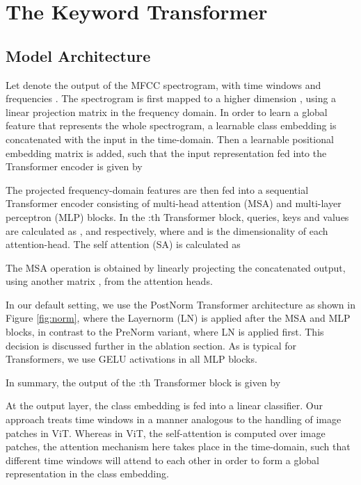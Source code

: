 \documentclass[a4paper]{article}
\begin{document}
\section{The Keyword Transformer}

\subsection{Model Architecture}

Let  denote the output of the MFCC spectrogram, with time windows  and frequencies . The spectrogram is first mapped to a higher dimension , using a linear projection matrix  in the frequency domain. In order to learn a global feature that represents the whole spectrogram, a learnable class embedding  is concatenated with the input in the time-domain. Then a learnable positional embedding matrix  is added, such that the input representation fed into the Transformer encoder is given by

The projected frequency-domain features are then fed into a sequential Transformer encoder consisting of  multi-head attention (MSA) and multi-layer perceptron (MLP) blocks. In the :th Transformer block, queries, keys and values are calculated as ,  and  respectively, where  and  is the dimensionality of each attention-head. The self attention (SA) is calculated as

The MSA operation is obtained by linearly projecting the concatenated output, using another matrix , from the  attention heads.

In our default setting, we use the PostNorm \cite{vaswani2017attention} Transformer architecture as shown in Figure \ref{fig:norm}, where the Layernorm (LN) \cite{ba2016layer} is applied after the MSA and MLP blocks, in contrast to the PreNorm \cite{he2016deep} variant, where LN is applied first. This decision is discussed further in the ablation section. As is typical for Transformers, we use GELU \cite{hendrycks2016gaussian} activations in all MLP blocks.

In summary, the output of the :th Transformer block is given by

At the output layer, the class embedding is fed into a linear classifier. Our approach treats time windows in a manner analogous to the handling of image patches in ViT. Whereas in ViT, the self-attention is computed over image patches, the attention mechanism here takes place in the time-domain, such that different time windows will attend to each other in order to form a global representation in the class embedding.
\end{document}
